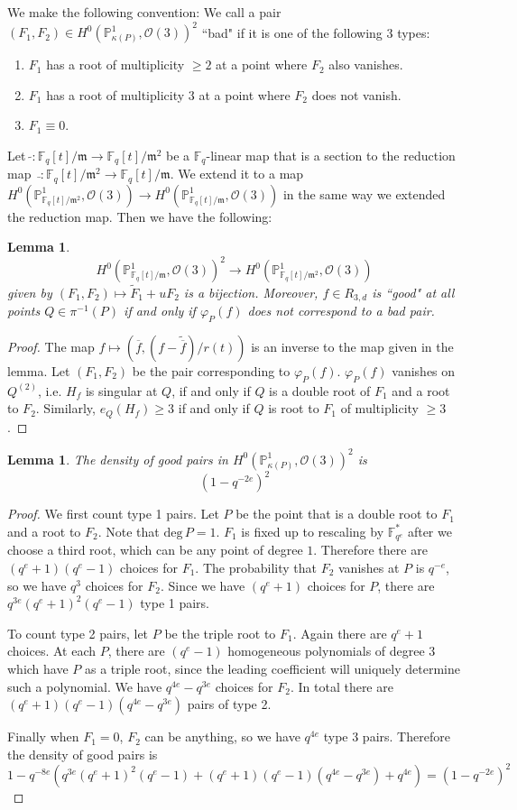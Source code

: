 \documentclass[12pt]{article}
\theoremstyle{plain}
\newtheorem{lemma}[equation]{Lemma}
\theoremstyle{definition}
\newcommand{\fm}{\mathfrak{m}}
\newcommand{\IF}{\mathbb{F}}
\newcommand{\IP}{\mathbb{P}}
\newcommand{\sO}{\mathcal{O}}
\renewcommand{\deg}{\mathrm{deg}\,}
\newcommand\wb{\overline}
\newcommand{\<}{\langle}
\renewcommand{\>}{\rangle}
\def\wt{\widetilde}
\begin{document}
We make the following convention:
 We call a pair $(F_1, F_2) \in H^0(\IP^1_{\kappa(P)}, \sO(3))^2$ ``bad" if it is one of the following 3 types:
\begin{enumerate}
\item $F_1$ has a root of multiplicity $\ge 2$ at a point where $F_2$ also vanishes. 
\item $F_1$ has a root of multiplicity $3$ at a point where $F_2$ does not vanish. 
\item $F_1 \equiv 0$.
\end{enumerate}
Let $\, \wt{} : \IF_q[t]/\fm \to \IF_q[t]/\fm^2$ be a $\IF_q$-linear map that is a section to the reduction map $\, \bar{} : \IF_q[t]/\fm^2 \to \IF_q[t]/\fm$. We extend it to a map $H^0(\IP^1_{\IF_q[t]/\fm^2}, \sO(3)) \to H^0(\IP^1_{\IF_q[t]/\fm}, \sO(3))$ in the same way we extended the reduction map. Then we have the following:
\begin{lemma}
$$ H^0(\IP^1_{\IF_q[t]/\fm}, \sO(3))^2 \to H^0(\IP^1_{\IF_q[t]/\fm^2}, \sO(3)) $$
given by $(F_1, F_2) \mapsto \wt{F}_1 + uF_2$ is a bijection. Moreover, $f \in R_{3, d}$ is ``good" at all points $Q \in \pi^{-1}(P)$ if and only if $\varphi_P(f)$ does not correspond to a bad pair. 
\end{lemma}
\begin{proof}
The map $f \mapsto ( \wb{f}, (f - \wt{\wb{f}})/r(t))$ is an inverse to the map given in the lemma. Let $(F_1, F_2)$ be the pair corresponding to $\varphi_P(f)$. $\varphi_P(f)$ vanishes on $Q^{(2)}$, i.e. $H_f$ is singular at $Q$, if and only if $Q$ is a double root of $F_1$ and a root to $F_2$. Similarly, $e_Q(H_f) \ge 3$ if and only if $Q$ is root to $F_1$ of multiplicity $\ge 3$. 
\end{proof}

\begin{lemma}
\label{count}
The density of good pairs in $H^0(\IP^1_{\kappa(P)}, \sO(3))^2$ is 
$$ (1 - q^{-2e})^{2} $$
\end{lemma}
\begin{proof}
We first count type 1 pairs. Let $P$ be the point that is a double root to $F_1$ and a root to $F_2$. Note that $\deg P = 1$. $F_1$ is fixed up to rescaling by $\IF_{q^e}^*$ after we choose a third root, which can be any point of degree $1$. Therefore there are $(q^e + 1)(q^e - 1)$ choices for $F_1$. The probability that $F_2$ vanishes at $P$ is $q^{-e}$, so we have $q^3$ choices for $F_2$. Since we have $(q^e + 1)$ choices for $P$, there are $q^{3e}(q^e + 1)^2(q^e - 1)$ type 1 pairs. 

To count type 2 pairs, let $P$ be the triple root to $F_1$. Again there are $q^e + 1$ choices. At each $P$, there are $(q^e -1)$ homogeneous polynomials of degree $3$ which have $P$ as a triple root, since the leading coefficient will uniquely determine such a polynomial. We have $q^{4e} - q^{3e}$ choices for $F_2$. In total there are $ (q^e + 1)(q^e - 1)(q^{4e} - q^{3e})$
pairs of type 2. 

Finally when $F_1 = 0$, $F_2$ can be anything, so we have $q^{4e}$ type 3 pairs.
Therefore the density of good pairs is 
$$ 1 - q^{-8e}(q^{3e}(q^e + 1)^2(q^e - 1) + (q^e + 1)(q^e - 1)(q^{4e} - q^{3e}) + q^{4e}) = (1 - q^{-2e})^2 $$ 
\end{proof}
\end{document}
